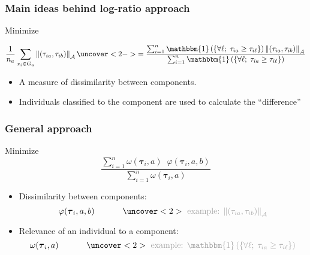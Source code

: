 \begin{frame}[t]
\frametitle{Main ideas behind log-ratio approach}
\small
Minimize
\begin{center}
\[
\frac{1}{n_a} \sum_{x_i \in G_a} \left\| (\tau_{ia}, \tau_{ib}) \right\|_{\mathcal{A}}  \uncover<2->{=
\frac%
{ \sum_{i=1}^n \mathbbm{1}\left( \{ \forall \ell; \; \tau_{ia} \geq \tau_{i\ell}  \} \right) \left\| (\tau_{ia}, \tau_{ib}) \right\|_{\mathcal{A}}  }%
{ \sum_{i=1}^n \mathbbm{1}\left( \{ \forall \ell; \; \tau_{ia} \geq \tau_{i\ell}  \} \right) }}
\]
\end{center}
\begin{itemize}
\item A measure of dissimilarity between components.
\item Individuals classified to the component are used to calculate the ``difference''
\end{itemize}

\end{frame}

\begin{frame}[t]
\frametitle{General approach}
\small
\begin{center}
Minimize
\[
\frac{ 
\sum_{i=1}^n \omega(\boldsymbol\tau_i, a) \;\; \varphi(\boldsymbol\tau_i, a, b) 
}{ 
\sum_{i=1}^n \omega(\boldsymbol\tau_i, a)
}
\]
\end{center}
\begin{itemize}
\item Dissimilarity between components: 
\[ \varphi(\boldsymbol\tau_i, a, b) \;\;\;\;\;\;\;\;\;\;\;\; \idea{\text{   example: $\left\| (\tau_{ia}, \tau_{ib}) \right\|_{\mathcal{A}}$}} \]
\item Relevance of an individual to a component: \[ \omega(\boldsymbol\tau_i, a) \;\;\;\;\;\;\;\;\;\;\;\; \idea{\text{   example: $\mathbbm{1}\left( \{ \forall \ell; \; \tau_{ia} \geq \tau_{i\ell}  \} \right)$}} \]
\end{itemize}

\end{frame}

